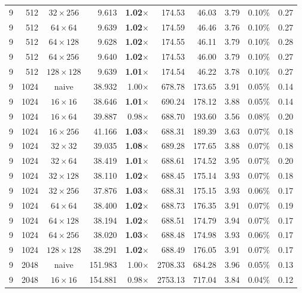 \documentclass[11pt,a4paper]{article}
\begin{document}
{\begin{longtable}{rrcrrrrrrr}
9 & 512 & $32\times 256$ & 9.613 & \textbf{1.02$\times$} & 174.53 & 46.03 & 3.79 & 0.10\% & 0.27 \\
9 & 512 & $64\times 64$ & 9.639 & \textbf{1.02$\times$} & 174.59 & 46.46 & 3.76 & 0.10\% & 0.27 \\
9 & 512 & $64\times 128$ & 9.628 & \textbf{1.02$\times$} & 174.55 & 46.11 & 3.79 & 0.10\% & 0.28 \\
9 & 512 & $64\times 256$ & 9.640 & \textbf{1.02$\times$} & 174.53 & 46.00 & 3.79 & 0.10\% & 0.27 \\
9 & 512 & $128\times 128$ & 9.639 & \textbf{1.01$\times$} & 174.54 & 46.22 & 3.78 & 0.10\% & 0.27 \\
\midrule
9 & 1024 & naive & 38.932 & 1.00$\times$ & 678.78 & 173.65 & 3.91 & 0.05\% & 0.14 \\
9 & 1024 & $16\times 16$ & 38.646 & \textbf{1.01$\times$} & 690.24 & 178.12 & 3.88 & 0.05\% & 0.14 \\
9 & 1024 & $16\times 64$ & 39.887 & 0.98$\times$ & 688.70 & 193.60 & 3.56 & 0.08\% & 0.20 \\
9 & 1024 & $16\times 256$ & 41.166 & \textbf{1.03$\times$} & 688.31 & 189.39 & 3.63 & 0.07\% & 0.18 \\
9 & 1024 & $32\times 32$ & 39.035 & \textbf{1.08$\times$} & 689.28 & 177.65 & 3.88 & 0.07\% & 0.18 \\
9 & 1024 & $32\times 64$ & 38.419 & \textbf{1.01$\times$} & 688.61 & 174.52 & 3.95 & 0.07\% & 0.20 \\
9 & 1024 & $32\times 128$ & 38.110 & \textbf{1.02$\times$} & 688.45 & 175.14 & 3.93 & 0.07\% & 0.18 \\
9 & 1024 & $32\times 256$ & 37.876 & \textbf{1.03$\times$} & 688.31 & 175.15 & 3.93 & 0.06\% & 0.17 \\
9 & 1024 & $64\times 64$ & 38.400 & \textbf{1.02$\times$} & 688.73 & 176.35 & 3.91 & 0.07\% & 0.19 \\
9 & 1024 & $64\times 128$ & 38.194 & \textbf{1.02$\times$} & 688.51 & 174.79 & 3.94 & 0.07\% & 0.17 \\
9 & 1024 & $64\times 256$ & 38.020 & \textbf{1.03$\times$} & 688.48 & 174.98 & 3.93 & 0.06\% & 0.17 \\
9 & 1024 & $128\times 128$ & 38.291 & \textbf{1.02$\times$} & 688.49 & 176.05 & 3.91 & 0.07\% & 0.17 \\
\midrule
9 & 2048 & naive & 151.983 & 1.00$\times$ & 2708.33 & 684.28 & 3.96 & 0.05\% & 0.13 \\
9 & 2048 & $16\times 16$ & 154.881 & 0.98$\times$ & 2753.13 & 717.04 & 3.84 & 0.04\% & 0.12 \\

\end{longtable}}
\end{document}
